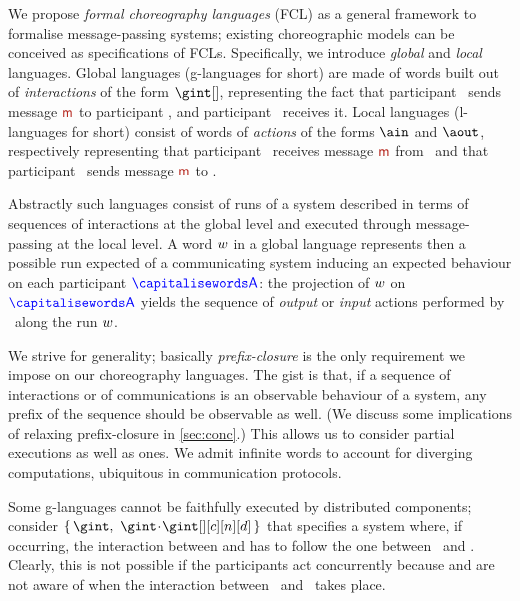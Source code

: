 We propose \emph{formal choreography languages} (FCL) as a general
framework to formalise message-passing systems; existing choreographic
models can be conceived as specifications of FCLs.
% 
Specifically, we introduce \emph{global} and \emph{local} languages.
%
Global languages (g-languages for short) are made of words built out
of \emph{interactions} of the form $\gint[]$, representing the fact
that participant \p\ sends message $\msg$ to participant \q, and
participant \q\ receives it.
%
Local languages (l-languages for short) consist of words of
\emph{actions} of the forms $\ain$ and $\aout$,
respectively representing that participant \q\ receives message
$\msg$ from \p\ and that participant \p\ sends message $\msg$ to \q.

Abstractly such languages consist of runs of a system described in
terms of sequences of interactions at the global level and executed
through message-passing at the local level.
%
A word $w$ in a global language represents then a possible run
expected of a communicating system %
%
%
inducing an expected  behaviour on each
participant $\p$: the projection of $w$ on $\p$ %
yields the sequence of \emph{output} or
\emph{input} actions performed by \p\ along the run $w$.

We strive for generality; basically \emph{prefix-closure} is the
only requirement we impose on our choreography languages.
%
The gist is that, if a sequence of interactions or of communications
is an observable behaviour of a system, any prefix of the sequence
should be observable as well.
%
(We discuss some implications of relaxing prefix-closure in
\cref{sec:conc}.)
%
This allows us to consider partial executions as well as
 ones.
%
We admit infinite words to account for diverging computations,
ubiquitous in communication protocols.

Some g-languages cannot be faithfully executed by distributed
components; consider $\Set{\gint, \ \gint \cat \gint[][c][n][d]}$ that
specifies a system where, if occurring, the interaction between \p[c]
and \p[d] has to follow the one between \p\ and \q.
%
Clearly, this is not possible if the participants act concurrently
because \p[c] and \p[d] are not aware of when the interaction between
\p\ and \q\ takes place.

